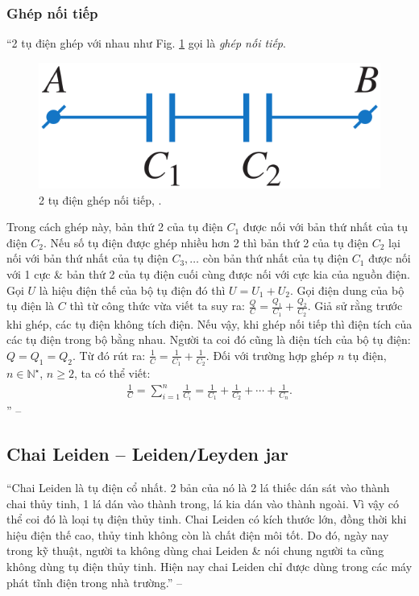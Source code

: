 \documentclass[oneside]{book}
\numberwithin{equation}{section}
\begin{document}
\subsubsection{Ghép nối tiếp}
``2 tụ điện ghép với nhau như Fig. \ref{fig:2_tu_dien_ghep_noi_tiep} gọi là \textit{ghép nối tiếp}.

\begin{figure}[H]
	\centering
	\includegraphics[scale=0.15]{2_tu_dien_ghep_noi_tiep}
	\caption{2 tụ điện ghép nối tiếp, \cite[Hình 7.6, p. 35]{SGK_Vat_Ly_11_nang_cao}.}
	\label{fig:2_tu_dien_ghep_noi_tiep}
\end{figure}
Trong cách ghép này, bản thứ 2 của tụ điện $C_1$ được nối với bản thứ nhất của tụ điện $C_2$. Nếu số tụ điện được ghép nhiều hơn 2 thì bản thứ 2 của tụ điện $C_2$ lại nối với bản thứ nhất của tụ điện $C_3,\ldots$ còn bản thứ nhất của tụ điện $C_1$ được nối với 1 cực \& bản thứ 2 của tụ điện cuối cùng được nối với cực kia của nguồn điện. Gọi $U$ là hiệu điện thế của bộ tụ điện đó thì $U = U_1 + U_2$. Gọi điện dung của bộ tụ điện là $C$ thì từ công thức vừa viết ta suy ra: $\frac{Q}{C} = \frac{Q_1}{C_1} + \frac{Q_2}{C_2}$. Giả sử rằng trước khi ghép, các tụ điện không tích điện. Nếu vậy, khi ghép nối tiếp thì điện tích của các tụ điện trong bộ bằng nhau. Người ta coi đó cũng là điện tích của bộ tụ điện: $Q = Q_1 = Q_2$. Từ đó rút ra: $\frac{1}{C} = \frac{1}{C_1} + \frac{1}{C_2}$. Đối với trường hợp ghép $n$ tụ điện, $n\in\mathbb{N}^\star$, $n\ge 2$, ta có thể viết:
\begin{align}
	\label{dien dung tuong duong bo tu dien ghep noi tiep}
	\frac{1}{C} = \sum_{i=1}^n \frac{1}{C_i} = \frac{1}{C_1} + \frac{1}{C_2} + \cdots + \frac{1}{C_n}.
\end{align}
'' -- \cite[pp. 35--36]{SGK_Vat_Ly_11_nang_cao}

\subsection{Chai Leiden -- Leiden\texttt{/}Leyden jar}
``Chai Leiden là tụ điện cổ nhất. 2 bản của nó là 2 lá thiếc dán sát vào thành chai thủy tinh, 1 lá dán vào thành trong, lá kia dán vào thành ngoài. Vì vậy có thể coi đó là loại tụ điện thủy tinh. Chai Leiden có kích thước lớn, đồng thời khi hiệu điện thế cao, thủy tinh không còn là chất điện môi tốt. Do đó, ngày nay trong kỹ thuật, người ta không dùng chai Leiden \& nói chung người ta cũng không dùng tụ điện thủy tinh. Hiện nay chai Leiden chỉ được dùng trong các máy phát tĩnh điện trong nhà trường.'' -- \cite[p. 37]{SGK_Vat_Ly_11_nang_cao}
\end{document}
